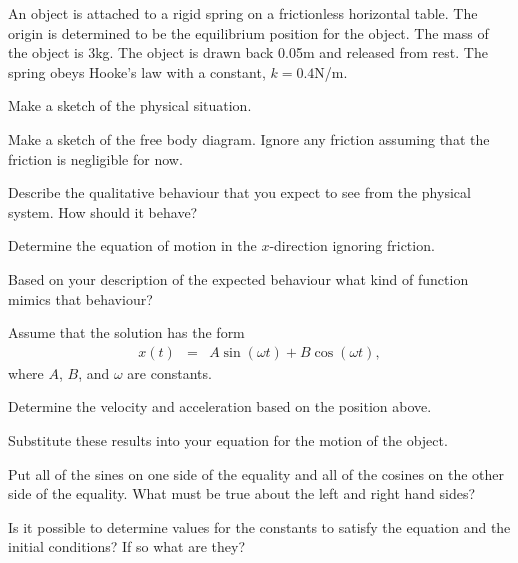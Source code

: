 \begin{problem}

\item An object is attached to a rigid spring on a frictionless
  horizontal table. The origin is determined to be the equilibrium
  position for the object. The mass of the object is 3kg. The object
  is drawn back 0.05m and released from rest. The spring obeys Hooke's
  law with a constant, $k=0.4$N/m.
  \begin{subproblem}
    \item Make a sketch of the physical situation.
      \vfill
    \item Make a sketch of the free body diagram. Ignore any friction
      assuming that the friction is negligible for now.
      \vfill
    \item Describe the qualitative behaviour that you expect to see
      from the physical system. How should it behave?
      \vfill
    \item Determine the equation of motion in the $x$-direction
      ignoring friction.  
      \vfill

    \item Based on your description of the expected behaviour what
      kind of function mimics that behaviour?
      \vspace{3em}

      \clearpage

    \item Assume that the solution has the form
      \begin{eqnarray*}
        x(t) & = & A \sin(\omega t) + B \cos(\omega t),
      \end{eqnarray*}
      where $A$, $B$, and $\omega$ are constants. 
      \begin{subproblem}
      \item Determine the velocity and acceleration based on the
        position above.  
        \vfill
      \item Substitute these results into your equation for the motion
        of the object.
        \vfill
        \clearpage
      \item Put all of the sines on one side of the equality and all
        of the cosines on the other side of the equality. What must be
        true about the left and right hand sides?
        \vspace{6em}
      \item Is it possible to determine values for the constants to
        satisfy the equation and the initial conditions? If so what
        are they?
        \vfill
      \end{subproblem}

  \end{subproblem}
\end{problem}

